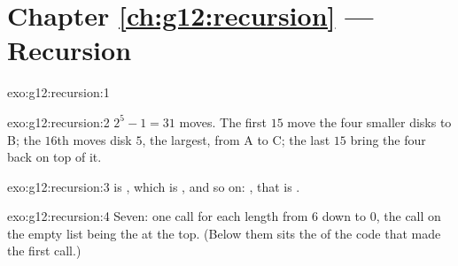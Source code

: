 \section*{Chapter \ref{ch:g12:recursion} --- Recursion}

\begin{solution}{exo:g12:recursion:1}
\smallskip\noindent\hspace*{2em}

\noindent\hspace*{4em}

\noindent\hspace*{6em}

\noindent\hspace*{8em}

\noindent\hspace*{8em}

\noindent\hspace*{6em}

\noindent\hspace*{4em}

\noindent\hspace*{2em}
\end{solution}

\begin{solution}{exo:g12:recursion:2}
$2^5 - 1 = 31$ moves. The first $15$ move the four smaller disks to B; the $16$th moves disk $5$, the largest, from A
to C; the last $15$ bring the four back on top of it.
\end{solution}

\begin{solution}{exo:g12:recursion:3}
 is , which is , and so on:
, that is .
\end{solution}

\begin{solution}{exo:g12:recursion:4}
Seven: one call for each length from $6$ down to $0$, the call on the empty list being the  at the top.
(Below them sits the  of the code that made the first call.)
\end{solution}


